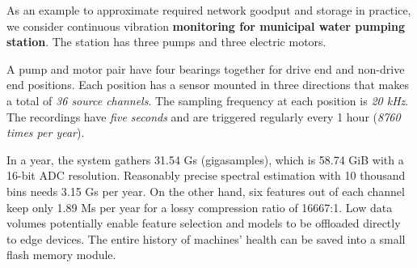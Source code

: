 As an example to approximate required network goodput and storage in practice, we consider continuous vibration \textbf{monitoring for municipal water pumping station}. The station has three pumps and three electric motors. 

A pump and motor pair have four bearings together for drive end and non-drive end positions. Each position has a sensor mounted in three directions that makes a total of \emph{36 source channels}. The sampling frequency at each position is \emph{20 kHz}. The recordings have \emph{five seconds} and are triggered regularly every 1 hour (\emph{8760 times per year}).

In a year, the system gathers 31.54 Gs (gigasamples), which is 58.74 GiB with a 16-bit ADC resolution. Reasonably precise spectral estimation with 10 thousand bins needs 3.15 Gs per year. On the other hand, six features out of each channel keep only 1.89 Ms per year for a lossy compression ratio of 16667:1. Low data volumes potentially enable feature selection and models to be offloaded directly to edge devices. The entire history of machines' health can be saved into a small flash memory module.
